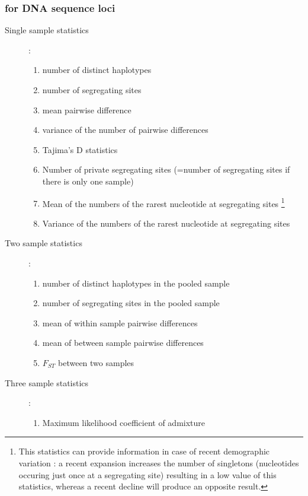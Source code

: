 \subsubsection{for DNA sequence loci}
\begin{description}
\item [{Single sample statistics}] :

\begin{enumerate}
\item number of distinct haplotypes
\item number of segregating sites
\item mean pairwise difference
\item variance of the number of pairwise differences
\item Tajima's D statistics \citep{TA1989}
\item Number of private segregating sites (=number of segregating sites
if there is only one sample)
\item Mean of the numbers of the rarest nucleotide at segregating sites%
\footnote{This statistics can provide information in case of recent demographic
variation : a recent expansion increases the number of singletons
(nucleotides occuring just once at a segregating site) resulting in
a low value of this statistics, whereas a recent decline will produce
an opposite result.%
}
\item Variance of the numbers of the rarest nucleotide at segregating sites
\end{enumerate}
\item [{Two sample statistics}] :

\begin{enumerate}
\item number of distinct haplotypes in the pooled sample
\item number of segregating sites in the pooled sample
\item mean of within sample pairwise differences
\item mean of between sample pairwise differences
\item $F_{ST}$ between two samples \citep{H1992}
\end{enumerate}
\item [{Three sample statistics}] :

\begin{enumerate}
\item Maximum likelihood coefficient of admixture \citep[adapted from][]{CF2004}
\end{enumerate}
\end{description}

